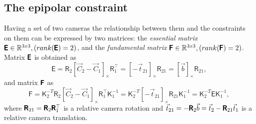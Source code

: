 \subsection{The epipolar constraint}
Having a set of two cameras the relationship between them and the constraints on them can be expressed by two matrices: the \textit{essential matrix} $\pmb{\mathsf{E}} \in \mathbb{R}^{3x3},( rank(\pmb{\mathsf{E}}) = 2)$, and the \textit{fundamental matrix} $\pmb{\mathsf{F}} \in \mathbb{R}^{3x3}, (rank(\pmb{\mathsf{F}}) = 2)$. Matrix $\pmb{\mathsf{E}}$ is obtained as
\begin{equation}
    \label{eq:E}
    \pmb{\mathsf{E}} = \pmb{\mathsf{R}}_2 [\vec{C}_2 - \vec{C}_1]_{\times} \pmb{\mathsf{R}}_1^\top = [-\vec{t}_{21}]_{\times} \pmb{\mathsf{R}}_{21} = [\vec{b}]_{\times} \pmb{\mathsf{R}}_{21},
\end{equation}
and matrix $\pmb{\mathsf{F}}$ as
\begin{equation}
    \label{eq:F}
    \pmb{\mathsf{F}} = \pmb{\mathsf{K}}_2^{-T} \pmb{\mathsf{R}}_2 [\vec{C}_2 - \vec{C}_1]_{\times} \pmb{\mathsf{R}}_1^\top \pmb{\mathsf{K}}_1^{-1} = 
    \pmb{\mathsf{K}}_2^{-T} [-\vec{t}_{21}]_{\times} \pmb{\mathsf{R}}_{21} \pmb{\mathsf{K}}_1^{-1} = 
    \pmb{\mathsf{K}}_2^{-T} \pmb{\mathsf{E}} \pmb{\mathsf{K}}_1^{-1},
\end{equation}
where 
$\pmb{\mathsf{R}}_{21} = \pmb{\mathsf{R}}_2 \pmb{\mathsf{R}}_1^\top$ is a relative camera rotation and 
$\vec{t}_{21} = -\pmb{\mathsf{R}}_2 \vec{b} = \vec{t}_2 - \pmb{\mathsf{R}}_{21}\vec{t}_1$ is a relative camera translation.

